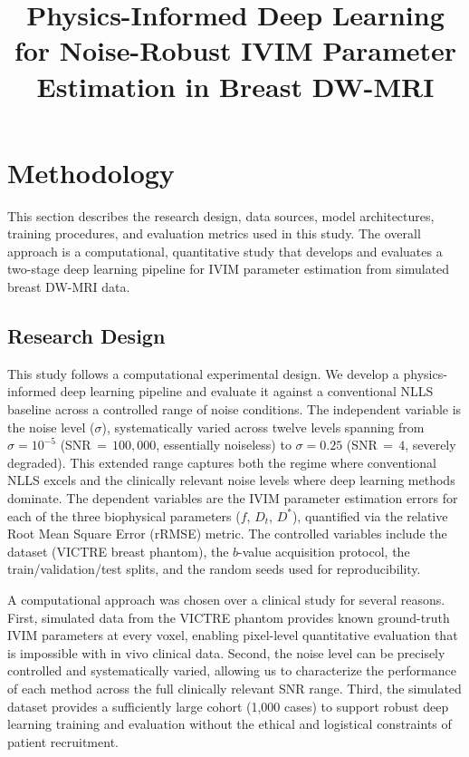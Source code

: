 \documentclass[12pt]{article}
\title{\textbf{Physics-Informed Deep Learning for Noise-Robust IVIM Parameter Estimation in Breast DW-MRI}}
\author{}
\date{}
\begin{document}
\maketitle

\section{Methodology}

This section describes the research design, data sources, model architectures, training procedures, and evaluation metrics used in this study. The overall approach is a computational, quantitative study that develops and evaluates a two-stage deep learning pipeline for IVIM parameter estimation from simulated breast DW-MRI data.

\subsection{Research Design}

This study follows a computational experimental design. We develop a physics-informed deep learning pipeline and evaluate it against a conventional NLLS baseline across a controlled range of noise conditions. The independent variable is the noise level ($\sigma$), systematically varied across twelve levels spanning from $\sigma = 10^{-5}$ (SNR$\,=\,100{,}000$, essentially noiseless) to $\sigma = 0.25$ (SNR$\,=\,4$, severely degraded). This extended range captures both the regime where conventional NLLS excels and the clinically relevant noise levels where deep learning methods dominate. The dependent variables are the IVIM parameter estimation errors for each of the three biophysical parameters ($f$, $D_t$, $D^*$), quantified via the relative Root Mean Square Error (rRMSE) metric. The controlled variables include the dataset (VICTRE breast phantom), the $b$-value acquisition protocol, the train/validation/test splits, and the random seeds used for reproducibility.

A computational approach was chosen over a clinical study for several reasons. First, simulated data from the VICTRE phantom provides known ground-truth IVIM parameters at every voxel, enabling pixel-level quantitative evaluation that is impossible with in vivo clinical data. Second, the noise level can be precisely controlled and systematically varied, allowing us to characterize the performance of each method across the full clinically relevant SNR range. Third, the simulated dataset provides a sufficiently large cohort (1,000 cases) to support robust deep learning training and evaluation without the ethical and logistical constraints of patient recruitment.
\end{document}
